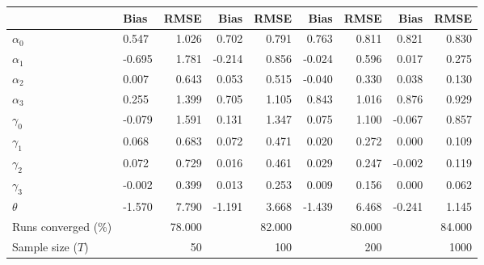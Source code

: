 
\begin{tabular}[t]{llrrrrrrr}
\toprule
  & Bias & RMSE & Bias & RMSE & Bias & RMSE & Bias & RMSE\\
\midrule
$\alpha_{0}$ & 0.547 & 1.026 & 0.702 & 0.791 & 0.763 & 0.811 & 0.821 & 0.830\\
$\alpha_{1}$ & -0.695 & 1.781 & -0.214 & 0.856 & -0.024 & 0.596 & 0.017 & 0.275\\
$\alpha_{2}$ & 0.007 & 0.643 & 0.053 & 0.515 & -0.040 & 0.330 & 0.038 & 0.130\\
$\alpha_{3}$ & 0.255 & 1.399 & 0.705 & 1.105 & 0.843 & 1.016 & 0.876 & 0.929\\
$\gamma_{0}$ & -0.079 & 1.591 & 0.131 & 1.347 & 0.075 & 1.100 & -0.067 & 0.857\\
$\gamma_{1}$ & 0.068 & 0.683 & 0.072 & 0.471 & 0.020 & 0.272 & 0.000 & 0.109\\
$\gamma_{2}$ & 0.072 & 0.729 & 0.016 & 0.461 & 0.029 & 0.247 & -0.002 & 0.119\\
$\gamma_{3}$ & -0.002 & 0.399 & 0.013 & 0.253 & 0.009 & 0.156 & 0.000 & 0.062\\
$\theta$ & -1.570 & 7.790 & -1.191 & 3.668 & -1.439 & 6.468 & -0.241 & 1.145\\
Runs converged (\%) &  & 78.000 &  & 82.000 &  & 80.000 &  & 84.000\\
Sample size ($T$) &  & 50 &  & 100 &  & 200 &  & 1000\\
\bottomrule
\end{tabular}
